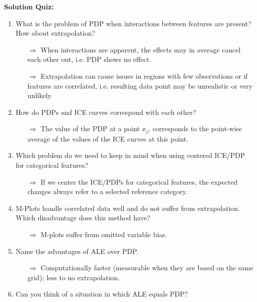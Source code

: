 \textbf{Solution Quiz:}\\\noindent
\medskip

\begin{enumerate}
  \item What is the problem of PDP when interactions between features are present? How about extrapolation?
        \begin{itemize}
        	\item[$\Rightarrow$] When interactions are apparent, the effects may in average cancel each other out, i.e. PDP shows no effect.
        	\item[$\Rightarrow$] Extrapolation can cause issues in regions with few observations or if features are correlated, i.e. resulting data point may be unrealistic or very unlikely.
        \end{itemize}
        \item How do PDPs and ICE curves correspond with each other?
        \begin{itemize}
        	\item[$\Rightarrow$] The value of the PDP at a point $x_j$, corresponds to the point-wise average of the values of the ICE curves at this point.
        \end{itemize}
        \item Which problem do we need to keep in mind when using centered ICE/PDP for categorical features? 
        \begin{itemize}
        	\item[$\Rightarrow$] If we center the ICE/PDPs for categorical features, the expected changes always refer to a selected reference category. 
        \end{itemize}
        \item M-Plots handle correlated data well and do not suffer from extrapolation. Which disadvantage does this method have?
        \begin{itemize}
        	\item[$\Rightarrow$] M-plots suffer from omitted variable bias.
        \end{itemize}
        \item Name the advantages of ALE over PDP.
        \begin{itemize}
        	\item[$\Rightarrow$] Computationally faster (measurable when they are based on the same grid); less to no extrapolation.
        \end{itemize}
    	\item Can you think of a situation in which ALE equals PDP?

\end{enumerate}
